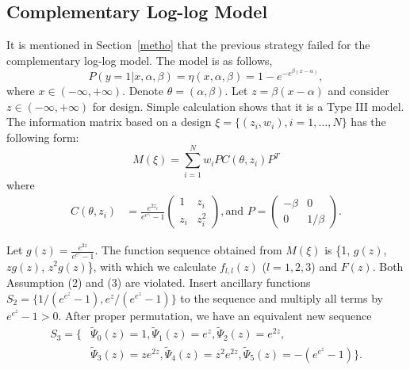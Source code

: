 \documentclass[12pt]{TD-CJS}
\begin{document}
\subsection{Complementary Log-log Model } \label{seccomp}

It is mentioned in Section~\ref{metho} that the previous strategy failed for the complementary log-log model. The model is as follows,\[
P(y=1|x,\alpha, \beta) = \eta(x,\alpha, \beta)= 1-e^{-e^{\beta(x-\alpha)}},
\] where $x\in (-\infty,+\infty)$. Denote $\theta = (\alpha,\beta) $. Let $z = \beta(x-\alpha)$ and consider $z\in (-\infty,+\infty)$ for design. Simple calculation shows that it is a Type III model. The information matrix based on a design $\xi = \{(z_i,w_i), i=1,\ldots,N\}$ has the following form: \[
M(\xi) = \sum_{i=1}^{N} w_i PC(\theta,z_i) P^T
\] where \begin{align*}
     C(\theta,z_i) & = \frac{e^{2z_i}}{e^{e^{z_i}}-1}\left( \begin{array}{cc}
1 & z_i\\
z_i & z_i^2
\end{array} \right), \text{and }
P = \left( \begin{array}{cc}
-\beta & 0\\
0 & 1/\beta
\end{array} \right).
\end{align*}



Let $g(z) =  \frac{e^{2z}}{e^{e^z}-1}$. The function sequence obtained from $M(\xi)$ is \{1, $g(z)$, $zg(z)$,  $z^2g(z)$\}, with which we calculate $f_{l,l}(z)$ ($l=1,2,3$) and $F(z)$. Both Assumption (2) and (3) are violated. Insert ancillary functions $S_2 = \{1/(e^{e^z}-1),e^z/(e^{e^z}-1)\}$ to the sequence and multiply all terms by $e^{e^z}-1>0$. After proper permutation, we have an equivalent new sequence 
\begin{align*}
    S_3  = \{&\tilde{\Psi}_0(z) = 1, \tilde{\Psi}_1(z) = e^z,\tilde{\Psi}_2(z) = e^{2z}, \\
    &\tilde{\Psi}_3(z) =ze^{2z},\tilde{\Psi}_4(z) = z^2e^{2z}, \tilde{\Psi}_5(z) = -(e^{e^z}-1)\}.
\end{align*} 
\end{document}
